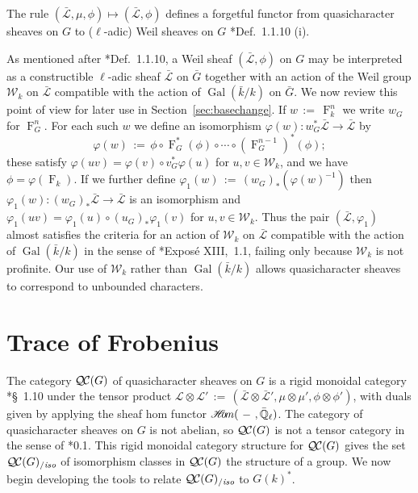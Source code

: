 \documentclass[11pt]{amsart}
\theoremstyle{plain}
\theoremstyle{definition}
\theoremstyle{remark}
\newcommand{\EE}{\mathbb{\bar Q}_\ell}
\newcommand{\bFq}{\bar{k}}
\newcommand{\Fq}{k}
\DeclareMathOperator{\Gal}{Gal}
\newcommand{\Frob}[1]{\operatorname{F}_{#1}}
\newcommand{\sheafHom}{{\mathscr{H}\hskip-4pt{\it o}\hskip-2pt{\it m}}}
\newcommand{\ceq}{{\, :=\, }}
\newcommand{\qcs}[1]{{\mathcal{#1}}}
\newcommand{\gqcs}[1]{{\mathcal{\bar #1}}}
\newcommand{\QC}{{\mathcal{Q\hskip-0.8pt C}}}
\newcommand{\QCiso}[1]{\QC(#1)_{/\textit{iso}}}
\newcommand{\Weil}[1]{\mathcal{W}_{#1}}
\newcommand{\bG}{\bar{G}}
\begin{document}
The rule $(\gqcs{L},\mu,\phi) \mapsto (\gqcs{L},\phi)$ defines a forgetful functor from quasicharacter
sheaves on $G$ to ($\ell$-adic) Weil sheaves on $G$ \cite{deligne:80a}*{Def.~1.1.10 (i)}.

As mentioned after \cite{deligne:80a}*{Def.~1.1.10}, a Weil sheaf $(\gqcs{L},\phi)$ on $G$
may be interpreted as a constructible $\ell$-adic sheaf $\gqcs{L}$ on $\bG$ together with
an action of the Weil group $\Weil{\Fq}$ on $\gqcs{L}$ compatible with the action of
$\Gal(\bFq/\Fq)$ on $\bG$. We now review this point of view for later use in
Section~\ref{sec:basechange}.  If $w \ceq \Frob{\Fq}^n$ we write $w_G$ for $\Frob{G}^n$.
For each such $w$ we define an isomorphism $\varphi(w) : w_G^* \gqcs{L}\to \gqcs{L}$ by
\[
\varphi(w) \ceq  \phi \circ \Frob{G}^*(\phi) \circ \cdots \circ (\Frob{G}^{n-1})^*(\phi);
\]
these satisfy $\varphi(uv) = \varphi(v) \circ v_G^* \varphi(u)$ for $u,v\in \Weil{\Fq}$, and
we have $\phi = \varphi(\Frob{\Fq})$. 
If we further define $\varphi_1(w) \ceq (w_G)_*(\varphi(w)^{-1})$ then
$\varphi_1(w) : (w_G)_* \gqcs{L}\to \gqcs{L}$ is an isomorphism and
$\varphi_1(uv) = \varphi_1(u) \circ (u_G)_* \varphi_1(v)$ for $u,v\in \Weil{\Fq}$.
Thus the pair $(\gqcs{L},\varphi_1)$ almost satisfies the criteria for an action of $\Weil{\Fq}$
on $\gqcs{L}$ compatible with the action of $\Gal(\bFq/\Fq)$ in the sense of
\cite{deligne:SGA4.5}*{Expos\'e XIII,~1.1}, failing only because $\Weil{\Fq}$ is not profinite.
Our use of $\Weil{\Fq}$ rather than $\Gal(\bFq/\Fq)$ allows quasicharacter sheaves to
correspond to unbounded characters.

\section{Trace of Frobenius}\label{sec:Frob}

The category $\QC(G)$ of quasicharacter sheaves on $G$ is a rigid monoidal category
\cite{etingof:09a}*{\S~1.10} under the tensor product
$\qcs{L} \otimes \qcs{L'} \ceq (\gqcs{L}\otimes\gqcs{L'}, \mu\otimes\mu', \phi\otimes \phi')$,
with duals given by applying the sheaf hom functor 
$\sheafHom(\ - \ ,\EE)$.
The category of quasicharacter sheaves on $G$ is not abelian, so $\QC(G)$
is not a tensor category in the sense of \cite{deligne:02a}*{0.1}.
This rigid monoidal category structure for $\QC(G)$ gives the set $\QCiso{G}$
of isomorphism classes in $\QC(G)$ the structure of a group.
We now begin developing the tools to relate $\QCiso{G}$ to $G(\Fq)^*$.
\end{document}
